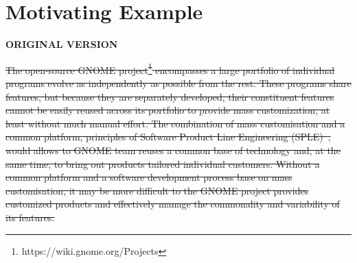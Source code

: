 \section{Motivating Example} \label{sec:motivating_example}



\textbf{ORIGINAL VERSION}

\sout{The open-source GNOME project\footnote{https://wiki.gnome.org/Projects} encompasses a large portfolio of individual programs evolve as independently as possible from the rest. These programs share features, but because they are separately developed, their constituent features cannot be easily reused across its portfolio to provide mass customization, at least without much manual effort. The combination of mass customisation and a common platform, principles of Software Product Line Engineering (SPLE)~\cite{Pohl2005}, would allows to GNOME team reuses a common base of technology and, at the same time, to bring out products tailored individual customers. Without a common platform and a software development process base on mass customisation, it may be more difficult to the GNOME project provides customized products and effectively manage the commonality and variability of its features.}


